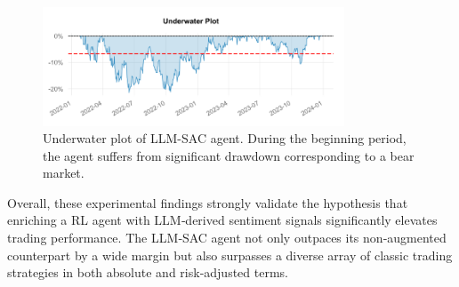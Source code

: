 \begin{figure}
  \centering
    \includegraphics[width=0.8\textwidth]{images/underwater_plot.png}
    \caption{Underwater plot of LLM-SAC agent. During the beginning period, the agent suffers from significant drawdown corresponding to a bear market.}
    \label{fig:underwater_plot}
\end{figure}

Overall, these experimental findings strongly validate the hypothesis that enriching a \gls{RL} agent with \gls{LLM}‑derived sentiment signals significantly elevates trading performance. The LLM‑SAC agent not only outpaces its non‑augmented counterpart by a wide margin but also surpasses a diverse array of classic trading strategies in both absolute and risk‑adjusted terms.
